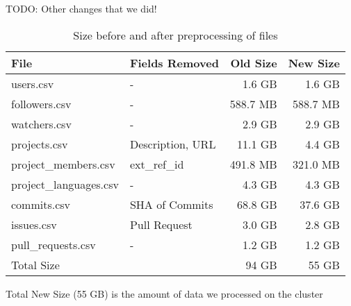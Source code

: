 \large{ TODO: Other changes that we did! }

\vspace{25px}
\begin{table}[htb]
    \centering

    \begin{tabular}{@{}llrr@{}}
    \toprule
        File & Fields Removed & Old Size & New Size \\
    \midrule
        users.csv              & -                &   1.6 GB &    1.6 GB \\
        followers.csv          & -                & 588.7 MB &  588.7 MB \\
        watchers.csv           & -                &   2.9 GB &    2.9 GB \\
        projects.csv           & Description, URL &  11.1 GB &    4.4 GB \\
        project\_members.csv   & ext\_ref\_id     & 491.8 MB &  321.0 MB \\
        project\_languages.csv & -                &   4.3 GB &    4.3 GB \\
        commits.csv            & SHA of Commits   &  68.8 GB &   37.6 GB \\
        issues.csv             & Pull Request     &   3.0 GB &    2.8 GB \\
        pull\_requests.csv     & -                &   1.2 GB &    1.2 GB \\
    \midrule
        Total Size             &                  &    94 GB &     55 GB \\
    \bottomrule
    \end{tabular}

    \caption{Size before and after preprocessing of files}
    \small{Total New Size (55 GB) is the amount of data we processed on the cluster}
\end{table}

